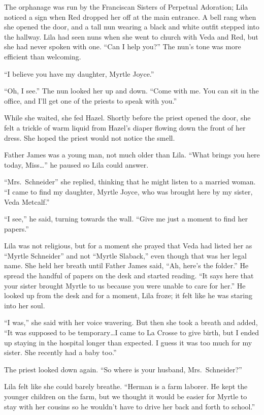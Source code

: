 \documentclass[
  letterpaper,
]{book}
\begin{document}
The orphanage was run by the Franciscan Sisters of Perpetual Adoration;
Lila noticed a sign when Red dropped her off at the main entrance. A
bell rang when she opened the door, and a tall nun wearing a black and
white outfit stepped into the hallway. Lila had seen nuns when she went
to church with Veda and Red, but she had never spoken with one. ``Can I
help you?'' The nun's tone was more efficient than welcoming.

``I believe you have my daughter, Myrtle Joyce.''

``Oh, I see.'' The nun looked her up and down. ``Come with me. You can
sit in the office, and I'll get one of the priests to speak with you.''

While she waited, she fed Hazel. Shortly before the priest opened the
door, she felt a trickle of warm liquid from Hazel's diaper flowing down
the front of her dress. She hoped the priest would not notice the smell.

Father James was a young man, not much older than Lila. ``What brings
you here today, Miss\ldots{}'' he paused so Lila could answer.

``Mrs.~Schneider'' she replied, thinking that he might listen to a
married woman. ``I came to find my daughter, Myrtle Joyce, who was
brought here by my sister, Veda Metcalf.''

``I see,'' he said, turning towards the wall. ``Give me just a moment to
find her papers.''

Lila was not religious, but for a moment she prayed that Veda had listed
her as ``Myrtle Schneider'' and not ``Myrtle Slaback,'' even though that
was her legal name. She held her breath until Father James said, ``Ah,
here's the folder.'' He spread the handful of papers on the desk and
started reading. ``It says here that your sister brought Myrtle to us
because you were unable to care for her.'' He looked up from the desk
and for a moment, Lila froze; it felt like he was staring into her soul.

``I was,'' she said with her voice wavering. But then she took a breath
and added, ``It was supposed to be temporary\ldots I came to La Crosse
to give birth, but I ended up staying in the hospital longer than
expected. I guess it was too much for my sister. She recently had a baby
too.''

The priest looked down again. ``So where is your husband,
Mrs.~Schneider?''

Lila felt like she could barely breathe. ``Herman is a farm laborer. He
kept the younger children on the farm, but we thought it would be easier
for Myrtle to stay with her cousins so he wouldn't have to drive her
back and forth to school.''
\end{document}
